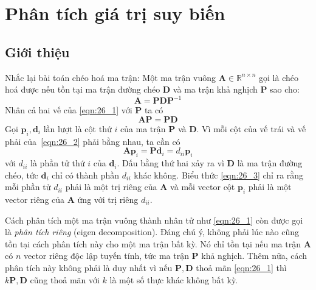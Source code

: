 \chapter{Phân tích giá trị suy biến}
\label{cha:svd}
\section{Giới thiệu}
Nhắc lại bài toán chéo hoá ma trận: Một ma trận vuông $\mathbf{A} \in \mathbb{R}^{n\times n}$ gọi là {chéo hoá được} nếu tồn tại ma trận đường chéo $\mathbf{D}$ và ma trận khả nghịch $\mathbf{P}$ sao cho:
\begin{equation}
\label{eqn:26_1}
\mathbf{A} = \mathbf{P} \mathbf{D} \mathbf{P}^{-1}
\end{equation}
Nhân cả hai vế của \eqref{eqn:26_1} với $\mathbf{P}$ ta có
\begin{equation}
\label{eqn:26_2}
\mathbf{AP} = \mathbf{PD}
\end{equation}
Gọi $\mathbf{p}_i, \mathbf{d}_i$ lần lượt là cột thứ $i$ của ma trận
$\mathbf{P}$ và $\mathbf{D}$. Vì mỗi cột của vế trái và vế phải
của~\eqref{eqn:26_2} phải bằng nhau, ta cần có
\begin{equation}
\label{eqn:26_3}
\mathbf{Ap}_i = \mathbf{Pd}_i = d_{ii}\mathbf{p}_i
\end{equation}
với $d_{ii}$ là phần tử thứ $i$ của $\mathbf{d}_i$. Dấu bằng thứ hai xảy ra vì
$\mathbf{D}$ là ma trận đường chéo, tức $\mathbf{d}_i$ chỉ có thành phần
$d_{ii}$ khác không. Biểu thức \eqref{eqn:26_3} chỉ ra rằng mỗi phần tử $d_{ii}$
phải là một {trị riêng} của $\mathbf{A}$ và mỗi vector cột $\mathbf{p}_i$ phải
là một {vector riêng} của $\mathbf{A}$ ứng với trị riêng $d_{ii}$.


Cách phân tích một ma trận vuông thành nhân tử như \eqref{eqn:26_1} còn được gọi
là \textit{phân tích riêng} (eigen decomposition). Đáng chú ý, không phải lúc nào cũng tồn tại cách phân tích này cho một ma trận bất kỳ. Nó chỉ tồn
tại nếu ma trận $\mathbf{A}$ có $n$ vector riêng độc lập tuyến tính, tức ma trận $\mathbf{P}$ khả nghịch. Thêm nữa, cách phân
tích này không phải là duy nhất vì nếu $\mathbf{P}, \mathbf{D}$ thoả mãn
\eqref{eqn:26_1} thì $k\mathbf{P}, \mathbf{D}$ cũng thoả mãn với $k$ là một số
thực khác không bất kỳ.

